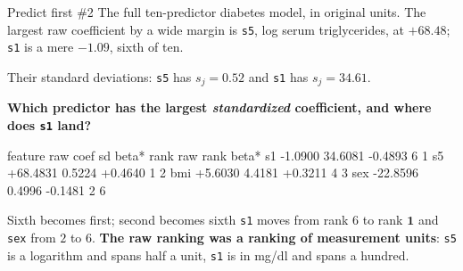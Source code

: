 \documentclass[aspectratio=169]{beamer}
\begin{document}
\begin{frame}[fragile,shrink=8]{Predict first \#2}
The full ten-predictor diabetes model, in original units. The largest raw
coefficient by a wide margin is \texttt{s5}, log serum triglycerides, at
$\mathbf{+68.48}$; \texttt{s1} is a mere $-1.09$, sixth of ten.

Their standard deviations: \texttt{s5} has $s_j = 0.52$ and \texttt{s1} has
$s_j = 34.61$.

\begin{center}
  \textbf{Which predictor has the largest \emph{standardized} coefficient,
  and where does \texttt{s1} land?}
\end{center}
\vspace{0.2em}
\begin{outblk}
feature    raw coef        sd      beta*   rank raw   rank beta*
s1           -1.0900   34.6081    -0.4893        6            1
s5          +68.4831    0.5224    +0.4640        1            2
bmi          +5.6030    4.4181    +0.3211        4            3
sex         -22.8596    0.4996    -0.1481        2            6
\end{outblk}
\begin{alertblock}{Sixth becomes first; second becomes sixth}
  \footnotesize \texttt{s1} moves from rank $6$ to rank $\mathbf{1}$ and
  \texttt{sex} from $2$ to $6$. \textbf{The raw ranking was a ranking of
  measurement units}: \texttt{s5} is a logarithm and spans half a unit,
  \texttt{s1} is in mg/dl and spans a hundred.
\end{alertblock}
\end{frame}
\end{document}
